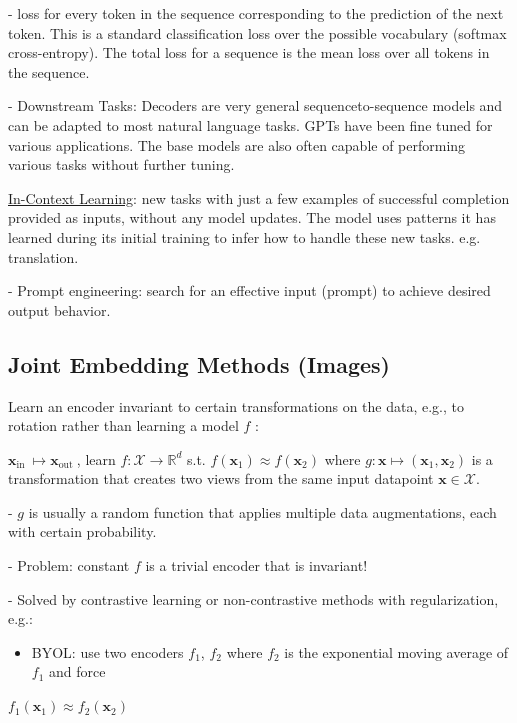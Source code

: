 - loss for every token in the sequence corresponding to the prediction of the next token. This is a standard classification loss over the possible vocabulary (softmax cross-entropy). The total loss for a sequence is the mean loss over all tokens in the sequence.

- Downstream Tasks: Decoders are very general sequenceto-sequence models and can be adapted to most natural language tasks. GPTs have been fine tuned for various applications. The base models are also often capable of performing various tasks without further tuning.

\underline{In-Context Learning}: new tasks with just a few examples of successful completion provided as inputs, without any model updates. The model uses patterns it has learned during its initial training to infer how to handle these new tasks. e.g. translation.

- Prompt engineering: search for an effective input (prompt) to achieve desired output behavior.

\subsection*{Joint Embedding Methods (Images)}
Learn an encoder invariant to certain transformations on the data, e.g., to rotation rather than learning a model $f$ :

$\mathbf{x}_{\text {in }} \mapsto \mathbf{x}_{\text {out }}$, learn $f: \mathcal{X} \rightarrow \mathbb{R}^{d}$ s.t.
$
f\left(\mathbf{x}_{1}\right) \approx f\left(\mathbf{x}_{2}\right)
$
where $g: \mathbf{x} \mapsto\left(\mathbf{x}_{1}, \mathbf{x}_{2}\right)$ is a transformation that creates two views from the same input datapoint $\mathbf{x} \in \mathcal{X}$.

- $g$ is usually a random function that applies multiple data augmentations, each with certain probability.

- Problem: constant $f$ is a trivial encoder that is invariant!

- Solved by contrastive learning or non-contrastive methods with regularization, e.g.:

\begin{itemize}
  \item BYOL: use two encoders $f_{1}$, $f_{2}$ where $f_{2}$ is the exponential moving average of $f_{1}$ and force
\end{itemize}

$
f_{1}\left(\mathbf{x}_{1}\right) \approx f_{2}\left(\mathbf{x}_{2}\right)
$


